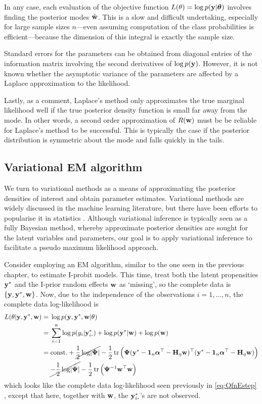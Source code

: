 In any case, each evaluation of the objective function $L(\theta) = \log p({\mathbf y}|{\bm\theta})$ involves finding the posterior modes $\hat{{\mathbf w}}$.
This is a slow and difficult undertaking, especially for large sample sizes $n$---even assuming computation of the class probabilities is efficient---because the dimension of this integral is exactly the sample size.

Standard errors for the parameters can be obtained from diagonal entries of the information matrix involving the second derivatives of $\log p({\mathbf y})$.
However, it is not known whether the asymptotic variance of the parameters are affected by a Laplace approximation to the likelihood.

Lastly, as a comment, Laplace's method only approximates the true marginal likelihood well if the true posterior density function is small far away from the mode.
In other words, a second order approximation of $R({\mathbf w})$ must be be reliable for Laplace's method to be successful.
This is typically the case if the posterior distribution is symmetric about the mode and falls quickly in the tails.

\subsection{Variational EM algorithm}

We turn to variational methods as a means of approximating the posterior densities of interest and obtain parameter estimates.
Variational methods are widely discussed in the machine learning literature, but there have been efforts to popularise it in statistics \citep{blei2017variational}.
Although variational inference is typically seen as a fully Bayesian method, whereby approximate posterior densities are sought for the latent variables and parameters, our goal is to apply variational inference to facilitate a pseudo maximum likelihood approach.

Consider employing an EM algorithm, similar to the one seen in the previous chapter, to estimate I-probit models.
This time, treat both the latent propensities ${\mathbf y}^*$ and the I-prior random effects ${\mathbf w}$ as `missing', so the complete data is $\{{\mathbf y},{\mathbf y}^*,{\mathbf w}\}$.
Now, due to the independence of the observations $i=1,\dots,n$, the complete data log-likelihood is
\begin{align}
  L(\theta |\by,\by^*,\bw) 
  ={}& \log p(\by,\by^*,\bw|\theta) \nonumber \\
  ={}& \sum_{i=1}^n \log p(y_i|\by^*_{i \bigcdot}) 
  + \log p(\by^*|\bw) + \log p(\bw) \nonumber \\
  ={}& \const + \cancel{\half\log\abs{\bPsi}} - \half \tr  
  \Big(
    \bPsi(\by^* - \bone_n\balpha^\top - \bH_\eta\bw)^\top 
    (\by^* - \bone_n\balpha^\top - \bH_\eta\bw)
  \Big) \nonumber \\
  &\cancel{- \half\log\abs{\bPsi}} 
  - \half \tr \Big(\bPsi^{-1} \bw^\top  \bw \Big)
  \label{eq:logjointprobit}
\end{align}
which looks like the complete data log-likelihood seen previously in \cref{eq:QfnEstep} , except that here, together with ${\mathbf w}$, the $\by^*_{i \bigcdot}$'s are not observed.

